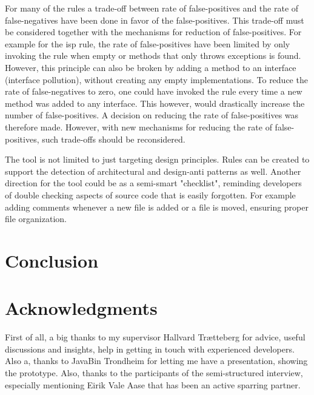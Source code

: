 \documentclass{report}
\begin{document}
For many of the rules a trade-off between rate of false-positives and the rate of false-negatives have been done in favor of the false-positives. This trade-off must be considered together with the mechanisms for reduction of false-positives. For example for the \gls{isp} rule, the rate of false-positives have been limited by only invoking the rule when empty or methods that only throws exceptions is found. However, this principle can also be broken by adding a method to an interface (interface pollution), without creating any empty implementations. To reduce the rate of false-negatives to zero, one could have invoked the rule every time a new method was added to any interface. This however, would drastically increase the number of false-positives. A decision on reducing the rate of false-positives was therefore made. However, with new mechanisms for reducing the rate of false-positives, such trade-offs should be reconsidered. 


The tool is not limited to just targeting design principles. Rules can be created to support the detection of architectural and design-anti patterns as well. Another direction for the tool could be as a semi-smart "checklist", reminding developers of double checking aspects of source code that is easily forgotten. For example adding comments whenever a new file is added or a file is moved, ensuring proper file organization. 

\section{Conclusion}
\label{conclusion}


\section{Acknowledgments}
\label{acknowledgements}
First of all, a big thanks to my supervisor Hallvard Trætteberg for advice, useful discussions and insights, help in getting in touch with experienced developers. Also a, thanks to JavaBin Trondheim for letting me have a presentation, showing the prototype. Also, thanks to the participants of the semi-structured interview, especially mentioning Eirik Vale Aase that has been an active sparring partner. 

\printbibliography

\appendix
\label{appendix}

\end{document}
